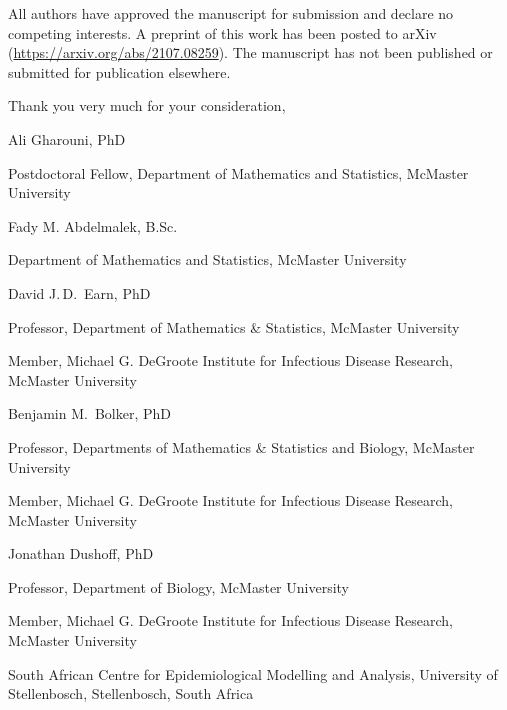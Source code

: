 \documentclass[12pt,letterpaper]{letter}
\begin{document}
All authors have approved the manuscript for submission and declare no competing interests. A preprint of this work has been posted to arXiv (\url{https://arxiv.org/abs/2107.08259}). The manuscript has not been published or submitted for publication elsewhere.

Thank you very much for your consideration,

\begin{multicols}{2}
\begin{flushleft}
\footnotesize

Ali Gharouni, PhD
\setlength{\parskip}{0em}

Postdoctoral Fellow, Department of Mathematics and Statistics, McMaster University

\vspace{1em}

Fady M. Abdelmalek, B.Sc.

Department of Mathematics and Statistics, McMaster University

\vfill\null
\columnbreak

David J.\,D.\ Earn, PhD

Professor, Department of Mathematics \& Statistics, McMaster University

Member, Michael G. DeGroote Institute for Infectious Disease Research, McMaster University

\vspace{1em}

Benjamin M.\ Bolker, PhD

Professor, Departments of Mathematics \& Statistics and Biology, McMaster University

Member, Michael G. DeGroote Institute for Infectious Disease Research, McMaster University

\vfill\null

Jonathan Dushoff, PhD

Professor, Department of Biology, McMaster University

Member, Michael G. DeGroote Institute for Infectious Disease Research, McMaster University

South African Centre for Epidemiological Modelling and Analysis, University of Stellenbosch, Stellenbosch, South Africa


\end{flushleft}
\end{multicols}

\thispagestyle{empty}
\end{document}
